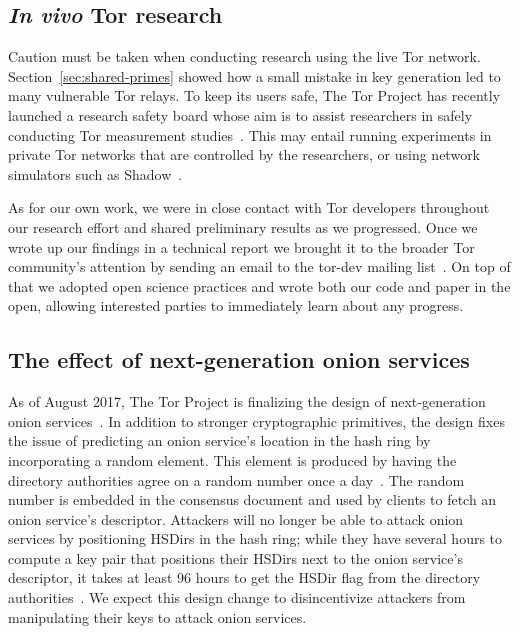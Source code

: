 \subsection{\textit{In vivo} Tor research}
Caution must be taken when conducting research using the live Tor network.
Section~\ref{sec:shared-primes} showed how a small mistake in key generation led
to many vulnerable Tor relays.  To keep its users safe, The Tor Project has
recently launched a research safety board whose aim is to assist researchers in
safely conducting Tor measurement studies~\cite{safety-board}.  This may entail
running experiments in private Tor networks that are controlled by the
researchers, or using network simulators such as Shadow~\cite{Jansen2012a}.

As for our own work, we were in close contact with Tor developers throughout our
research effort and shared preliminary results as we progressed.  Once we wrote
up our findings in a technical report we brought it to the broader Tor
community's attention by sending an email to the tor-dev mailing
list~\cite{Roberts2017a}.  On top of that we adopted open science practices and
wrote both our code and paper in the open, allowing interested parties to
immediately learn about any progress.

\subsection{The effect of next-generation onion services}
As of August 2017, The Tor Project is finalizing the design of next-generation
onion services~\cite{prop224}.  In addition to stronger cryptographic
primitives, the design fixes the issue of predicting an onion service's location
in the hash ring by incorporating a random element.  This element is produced by
having the directory authorities agree on a random number once a
day~\cite{prop250}.  The random number is embedded in the consensus document and
used by clients to fetch an onion service's descriptor.  Attackers will no
longer be able to attack onion services by positioning HSDirs in the hash ring;
while they have several hours to compute a key pair that positions their HSDirs
next to the onion service's descriptor, it takes at least 96 hours to get the
HSDir flag from the directory authorities~\cite[\S~3.4.2]{dir-spec}.  We expect
this design change to disincentivize attackers from manipulating their keys to
attack onion services.
